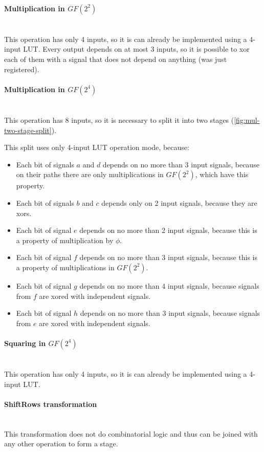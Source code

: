 \paragraph{Multiplication in $GF(2^2)$}\mbox{}\\
This operation has only 4 inputs, so it is can already be implemented using a 4-input LUT. Every output depends on at most 3 inputs, so it is possible to xor each of them with a signal that does not depend on anything (was just registered).

\paragraph{Multiplication in $GF(2^4)$}\mbox{}\\
This operation has 8 inputs, so it is necessary to split it into two stages (\ref{fig:mul-two-stage-split}).

This split uses only 4-input LUT operation mode, because:
\begin{itemize}[nolistsep]
\item Each bit of signals $a$ and $d$ depends on no more than 3 input signals, because on their paths there are only multiplications in $GF(2^2)$, which have this property. 
\item Each bit of signals $b$ and $c$ depends only on 2 input signals, because they are xors.
\item Each bit of signal $e$ depends on no more than 2 input signals, because this is a property of multiplication by $\phi$.
\item Each bit of signal $f$ depends on no more than 3 input signals, because this is a property of multiplications in $GF(2^2)$.
\item Each bit of signal $g$ depends on no more than 4 input signals, because signals from $f$ are xored with independent signals.
\item Each bit of signal $h$ depends on no more than 3 input signals, because signals from $e$ are xored with independent signals.
\end{itemize}


\paragraph{Squaring in $GF(2^4)$}\mbox{}\\
This operation has only 4 inputs, so it is can already be implemented using a 4-input LUT.


\paragraph{ShiftRows transformation}\mbox{}\\
This transformation does not do combinatorial logic and thus can be joined with any other operation to form a stage.


